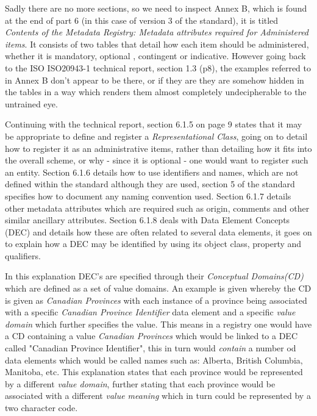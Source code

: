 \documentclass{article}
\begin{document}
Sadly there are no more sections, so we need to inspect Annex B, which is found at the end of part 6 (in this case of version 3 of the standard), it is titled \emph{ Contents of the Metadata Registry: Metadata attributes required for Administered items}. It consists of two tables that detail how each item should be administered, whether it is mandatory, optional , contingent or indicative.  However going back to the ISO ISO20943-1 technical report, section 1.3 (p8), the examples referred to in Annex B don't appear to be there, or if they are they are somehow hidden in the tables in a way which renders them almost completely undecipherable to the untrained eye. 

Continuing with the technical report, section 6.1.5 on page 9 states that it may be appropriate to define and register a \emph{Representational Class}, going on to detail how to register it as an administrative items, rather than detailing how it fits into the overall scheme, or why - since it is optional - one would want to register such an entity. Section 6.1.6 details how to use identifiers and names, which are not defined within the standard although they are used, section 5 of the standard specifies how to document any naming convention used. Section 6.1.7 details other metadata attributes which are required such as origin, comments and other similar ancillary attributes. Section 6.1.8 deals with Data Element Concepts (DEC) and details how these are often related to several data elements, it goes on to explain how a DEC may be identified by using its object class, property and qualifiers. 

In this explanation DEC's are specified through their \emph{Conceptual Domains(CD)} which are defined as a set of value domains. An example is given whereby the CD is given as \emph{Canadian Provinces} with each instance of a province being associated with a specific \emph{Canadian Province Identifier} data element and a specific \emph{value domain} which further specifies the value. This means in a registry one would have a CD containing a value \emph{Canadian Provinces} which would be linked to a DEC called "Canadian Province Identifier", this in turn would \emph{contain} a number od data elements which would be called names such as: Alberta, British Columbia, Manitoba, etc. This explanation states that each province would be represented by a different \emph{value domain}, further stating that each province would be associated with a different \emph{value meaning} which in turn could be represented by a two character code. 
\end{document}
